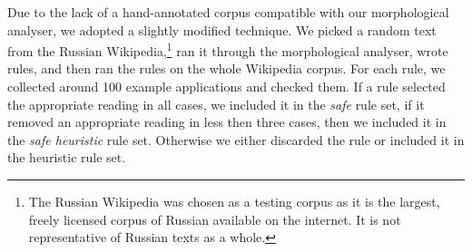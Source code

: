 \documentclass[11pt]{article}
\newcommand{\rr}[1]{\marginpar{\scriptsize R: #1}} %
\begin{document}
Due to the lack of a hand-annotated corpus compatible with our morphological
analyser, we adopted a slightly modified technique. We picked a random text
from the Russian Wikipedia,\footnote{The Russian Wikipedia was chosen as a testing corpus
  as it is the largest, freely licensed corpus of Russian available on the internet. It is 
  not representative of Russian texts as a whole.}
ran it through the morphological analyser, wrote
rules, and then ran the rules on the whole Wikipedia corpus. For each rule,
we collected around 100 example applications and checked them. If a rule
selected the appropriate reading in all cases, we included it in the \emph{safe}
rule set, if it removed an appropriate reading in less then three cases, 
then we included it in the \emph{safe heuristic} rule set. Otherwise we either
discarded the rule or included it in the heuristic rule set.
\end{document}
